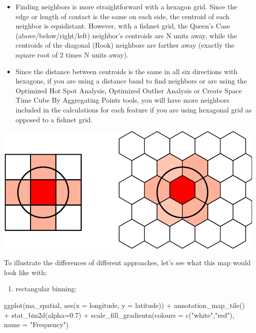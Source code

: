 \documentclass[
]{book}
\newenvironment{Shaded}{\begin{snugshade}}{\end{snugshade}}
\newcommand{\AttributeTok}[1]{\textcolor[rgb]{0.77,0.63,0.00}{#1}}
\newcommand{\FloatTok}[1]{\textcolor[rgb]{0.00,0.00,0.81}{#1}}
\newcommand{\FunctionTok}[1]{\textcolor[rgb]{0.00,0.00,0.00}{#1}}
\newcommand{\NormalTok}[1]{#1}
\newcommand{\SpecialCharTok}[1]{\textcolor[rgb]{0.00,0.00,0.00}{#1}}
\newcommand{\StringTok}[1]{\textcolor[rgb]{0.31,0.60,0.02}{#1}}
\providecommand{\tightlist}{%
  \setlength{\itemsep}{0pt}\setlength{\parskip}{0pt}}
\begin{document}
\begin{itemize}
\item
  Finding neighbors is more straightforward with a hexagon grid. Since the edge or length of contact is the same on each side, the centroid of each neighbor is equidistant. However, with a fishnet grid, the Queen's Case (above/below/right/left) neighbor's centroids are N units away, while the centroids of the diagonal (Rook) neighbors are farther away (exactly the square root of 2 times N units away).
\item
  Since the distance between centroids is the same in all six directions with hexagons, if you are using a distance band to find neighbors or are using the Optimized Hot Spot Analysis, Optimized Outlier Analysis or Create Space Time Cube By Aggregating Points tools, you will have more neighbors included in the calculations for each feature if you are using hexagonal grid as opposed to a fishnet grid.
\end{itemize}

\includegraphics{crime_mapping_files/figure-latex/unnamed-chunk-127-1.pdf}

To illustrate the differences of different approaches, let's see what this map would look like with:

\begin{enumerate}
\def\labelenumi{\alph{enumi})}
\tightlist
\item
  rectangular binning:
\end{enumerate}

\begin{Shaded}
\begin{Highlighting}[]
\FunctionTok{ggplot}\NormalTok{(ma\_spatial, }\FunctionTok{aes}\NormalTok{(}\AttributeTok{x =}\NormalTok{ longitude, }\AttributeTok{y =}\NormalTok{ latitude)) }\SpecialCharTok{+} 
  \FunctionTok{annotation\_map\_tile}\NormalTok{() }\SpecialCharTok{+} 
  \FunctionTok{stat\_bin2d}\NormalTok{(}\AttributeTok{alpha=}\FloatTok{0.7}\NormalTok{) }\SpecialCharTok{+} 
  \FunctionTok{scale\_fill\_gradientn}\NormalTok{(}\AttributeTok{colours =} \FunctionTok{c}\NormalTok{(}\StringTok{"white"}\NormalTok{,}\StringTok{"red"}\NormalTok{), }
                       \AttributeTok{name =} \StringTok{"Frequency"}\NormalTok{) }
\end{Highlighting}
\end{Shaded}
\end{document}
